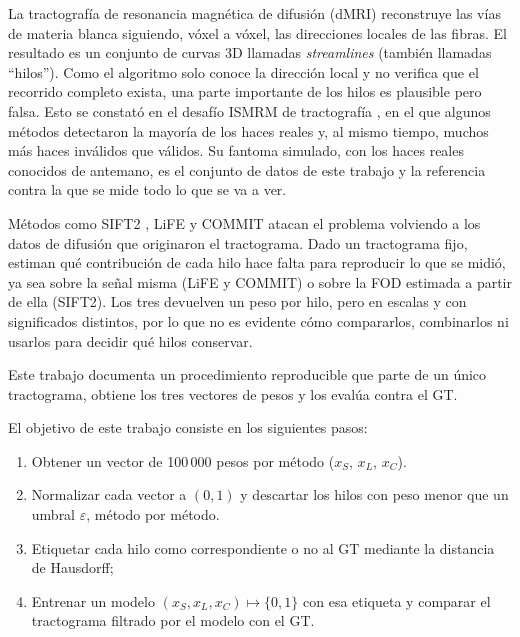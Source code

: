 \documentclass[11pt,a4paper]{article}
\newcommand{\eps}{\varepsilon}
\begin{document}
La tractograf\'ia de resonancia magn\'etica de difusi\'on (dMRI) reconstruye las v\'ias de
materia blanca siguiendo, v\'oxel a v\'oxel, las direcciones locales de las fibras. El
resultado es un conjunto de curvas 3D llamadas \textit{streamlines} (también llamadas ``hilos'').
Como el algoritmo solo conoce la direcci\'on local y no verifica que el recorrido completo
exista, una parte importante de los hilos es plausible pero falsa. Esto se constat\'o en el desaf\'io ISMRM de tractograf\'ia \cite{maierhein2017}, en el que algunos métodos detectaron la mayor\'ia de los haces reales y, al mismo tiempo, muchos m\'as haces
inv\'alidos que v\'alidos. Su fantoma simulado, con los haces reales conocidos
de antemano, es el conjunto de datos de este trabajo y la referencia contra la
que se mide todo lo que se va a ver.

Métodos como SIFT2 \cite{smith2015}, LiFE \cite{pestilli2014} y COMMIT \cite{daducci2015}
atacan el problema volviendo a los datos de difusi\'on que originaron el
tractograma. Dado un tractograma fijo, estiman qu\'e contribuci\'on de cada hilo
hace falta para reproducir lo que se midi\'o, ya sea sobre la se\~nal misma
(LiFE y COMMIT) o sobre la FOD estimada a partir de ella (SIFT2). Los tres
devuelven un peso por hilo, pero en escalas y con significados distintos, por lo
que no es evidente c\'omo compararlos, combinarlos ni usarlos para decidir qu\'e
hilos conservar.


Este trabajo documenta un procedimiento reproducible que parte de un \'unico
tractograma, obtiene los tres vectores de pesos y los eval\'ua contra el GT. 

El objetivo de este trabajo consiste en los siguientes pasos:

\begin{enumerate}[label=\textbf{\Alph*.}]
  \item Obtener un vector de 100\,000 pesos por m\'etodo ($x_S$, $x_L$, $x_C$).
  \item Normalizar cada vector a $(0,1)$ y descartar los hilos con peso menor que un umbral $\eps$, m\'etodo por m\'etodo.
  \item Etiquetar cada hilo como correspondiente o no al GT mediante la distancia de Hausdorff;
  \item Entrenar un modelo $(x_S,x_L,x_C)\mapsto\{0,1\}$ con esa etiqueta y comparar el tractograma filtrado por el modelo con el GT.
\end{enumerate}
\end{document}
